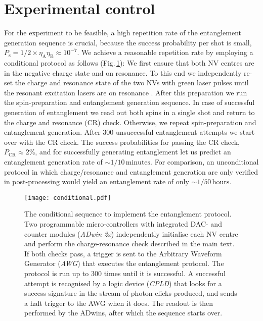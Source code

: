 \section{Experimental control}
For the experiment to be feasible, a high repetition rate of the entanglement generation sequence is crucial, because the success probability per shot is small, $P_\mathrm s = 1/2 \times \eta_\mathrm A\eta_\mathrm B \approx 10^{-7}$. We achieve a reasonable repetition rate by employing a conditional protocol as follows (Fig.\,\ref{fig:conditional_measurement}): We first ensure that both NV centres are in the negative charge state and on resonance. To this end we independently re-set the charge and resonance state of the two NVs with green laser pulses until the resonant excitation lasers are on resonance \cite{Robledo:2011fs,Pfaff:2012ue}. After this preparation we run the spin-preparation and entanglement generation sequence. In case of successful generation of entanglement we read out both spins in a single shot and return to the charge and resonance (CR) check. Otherwise, we repeat spin-preparation and entanglement generation. After 300 unsuccessful entanglement attempts we start over with the CR check. The success probabilities for passing the CR check, $P_\mathrm{CR} \approx 2\%$, and for successfully generating entanglement let us predict an entanglement generation rate of $\sim 1/10\,\mathrm{minutes}$. For comparison, an unconditional protocol in which charge/resonance and entanglement generation are only verified in post-processing would yield an entanglement rate of only $\sim 1/50\,\mathrm{hours}$.

\begin{figure}[h]
\centering
\texttt{[image: conditional.pdf]}
\caption{The conditional sequence to implement the entanglement protocol. Two programmable micro-controllers with integrated DAC- and counter modules ({\em ADwin 2x})  independently initialise each NV centre and perform the charge-resonance check described in the main text. If both checks pass, a trigger is sent to the Arbitrary Waveform Generator ({\em AWG}) that executes the entanglement protocol. The protocol is run up to 300 times until it is successful. A successful attempt is recognised by a logic device ({\em CPLD}) that looks for a success-signature in the stream of photon clicks produced, and sends a halt trigger to the AWG when it does. The readout is then performed by the ADwins, after which the sequence starts over.}
\label{fig:conditional_measurement}
\end{figure}

